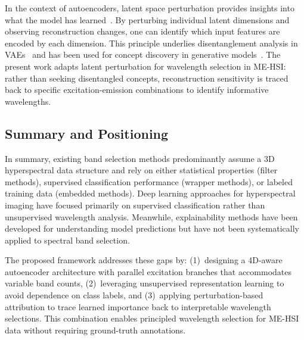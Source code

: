 In the context of autoencoders, latent space perturbation provides insights into what the model has learned~\cite{higgins2017beta}.
By perturbing individual latent dimensions and observing reconstruction changes, one can identify which input features are encoded by each dimension.
This principle underlies disentanglement analysis in VAEs~\cite{chen2018isolating} and has been used for concept discovery in generative models~\cite{voynov2020unsupervised}.
The present work adapts latent perturbation for wavelength selection in ME-HSI: rather than seeking disentangled concepts, reconstruction sensitivity is traced back to specific excitation-emission combinations to identify informative wavelengths.

\subsection{Summary and Positioning}
\label{sec:related_summary}

In summary, existing band selection methods predominantly assume a 3D hyperspectral data structure and rely on either statistical properties (filter methods), supervised classification performance (wrapper methods), or labeled training data (embedded methods).
Deep learning approaches for hyperspectral imaging have focused primarily on supervised classification rather than unsupervised wavelength analysis.
Meanwhile, explainability methods have been developed for understanding model predictions but have not been systematically applied to spectral band selection.

The proposed framework addresses these gaps by: (1)~designing a 4D-aware autoencoder architecture with parallel excitation branches that accommodates variable band counts, (2)~leveraging unsupervised representation learning to avoid dependence on class labels, and (3)~applying perturbation-based attribution to trace learned importance back to interpretable wavelength selections.
This combination enables principled wavelength selection for ME-HSI data without requiring ground-truth annotations.